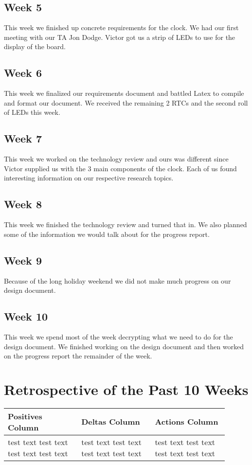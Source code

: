 \documentclass[10pt,draftclsnofoot,onecolumn]{IEEEtran}
\begin{document}
\subsection{Week 5}
This week we finished up concrete requirements for the clock.
We had our first meeting with our TA Jon Dodge.
Victor got us a strip of LEDs to use for the display of the board.

\subsection{Week 6}
This week we finalized our requirements document and battled Latex to compile and format our document.
We received the remaining 2 RTCs and the second roll of LEDs this week.

\subsection{Week 7}
This week we worked on the technology review and ours was different since Victor supplied us with the 3 main components of the clock.
Each of us found interesting information on our respective research topics.

\subsection{Week 8}
This week we finished the technology review and turned that in.
We also planned some of the information we would talk about for the progress report.

\subsection{Week 9}
Because of the long holiday weekend we did not make much progress on our design document.

\subsection{Week 10}
This week we spend most of the week decrypting what we need to do for the design document. 
We finished working on the design document and then worked on the progress report the remainder of the week.


\section{Retrospective of the Past 10 Weeks}
\begin{center}
\begin{tabular}{| p{0.3\linewidth} | p{0.3\linewidth} | p{0.3\linewidth} |}
\hline
Positives Column & 
Deltas Column & 
Actions Column \\
\hline
test text test text test text test text &
test text test text test text test text &
test text test text test text test text \\
\hline
\end{tabular}
\end{center}
\end{document}
